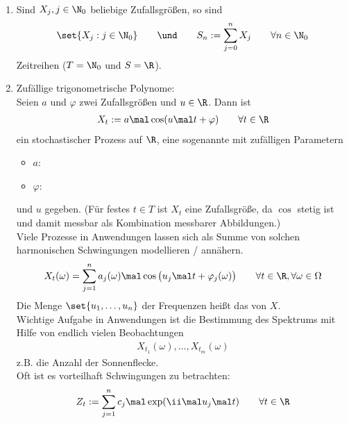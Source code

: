 \begin{beispiel}\label{beisp1.3.3}\
	\begin{enumerate}[label=(\alph*)]
		\item Sind $X_j,j\in\N_0$ beliebige Zufallsgrößen, so sind 
		\begin{align*}
			\set{X_j:j\in\N_0}
			\qquad\und\qquad
			S_n:=\sum\limits_{j=0}^n X_j\qquad\forall n\in\N_0
		\end{align*}
		Zeitreihen ($T=\N_0$ und $S=\R$).
		\item Zufällige trigonometrische Polynome:\label{beisp:1.3.3(b)}\\
		Seien $a$ und $\varphi$ zwei Zufallsgrößen und $u\in\R$.
		Dann ist 
		\begin{align*}
			X_t:=a\mal\cos(u\mal t+\varphi)\qquad\forall t\in\R
		\end{align*}
		ein stochastischer Prozess auf $\R$, eine sogenannte  mit zufälligen Parametern
		\begin{itemize}
			\item $a$: 
			\item $\varphi$: 
		\end{itemize}
		und  $u$ gegeben.
		(Für festes $t\in T$ ist $X_t$ eine Zufallsgröße, da $\cos$ stetig ist und damit messbar als Kombination messbarer Abbildungen.)\\
		Viele Prozesse in Anwendungen lassen sich als Summe von solchen harmonischen Schwingungen modellieren / annähern.
		\begin{align*}
			X_t(\omega)=\sum\limits_{j=1}^n a_j(\omega)\mal\cos\big(u_j\mal t+\varphi_j(\omega)\big)\qquad\forall t\in\R,\forall\omega\in\Omega
		\end{align*}
		Die Menge $\set{u_1,\ldots,u_n}$ der Frequenzen heißt das  von $X$. \\
		Wichtige Aufgabe in Anwendungen ist die Bestimmung des Spektrums mit Hilfe von endlich vielen Beobachtungen 
		\begin{align*}
			X_{t_1}(\omega),\ldots,X_{t_m}(\omega)
		\end{align*}
		z.B. die Anzahl der Sonnenflecke.\\
		Oft ist es vorteilhaft  Schwingungen zu betrachten:
		\begin{align*}%
			Z_t:=\sum\limits_{j=1}^n c_j\mal\exp(\ii\mal u_j\mal t)\qquad\forall t\in\R

\end{align*}
\end{enumerate}
\end{beispiel}
